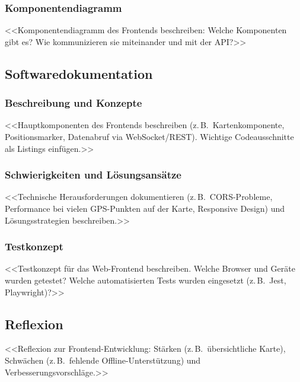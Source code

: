 \subsubsection{Komponentendiagramm}
<<Komponentendiagramm des Frontends beschreiben: Welche Komponenten gibt es?
Wie kommunizieren sie miteinander und mit der API?>>

\subsection{Softwaredokumentation}

\subsubsection{Beschreibung und Konzepte}
<<Hauptkomponenten des Frontends beschreiben (z.\,B.\ Kartenkomponente,
Positionsmarker, Datenabruf via WebSocket/REST). Wichtige Codeausschnitte
als Listings einfügen.>>


\subsubsection{Schwierigkeiten und Lösungsansätze}
<<Technische Herausforderungen dokumentieren (z.\,B.\ CORS-Probleme, Performance
bei vielen GPS-Punkten auf der Karte, Responsive Design) und Lösungsstrategien
beschreiben.>>

\subsubsection{Testkonzept}
<<Testkonzept für das Web-Frontend beschreiben. Welche Browser und Geräte wurden
getestet? Welche automatisierten Tests wurden eingesetzt (z.\,B.\ Jest,
Playwright)?>>

\subsection{Reflexion}
<<Reflexion zur Frontend-Entwicklung: Stärken (z.\,B.\ übersichtliche Karte),
Schwächen (z.\,B.\ fehlende Offline-Unterstützung) und Verbesserungsvorschläge.>>
